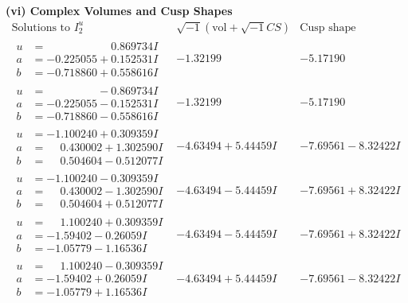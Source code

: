 \documentclass[1p]{elsarticle_modified}
\theoremstyle{definition}
\newcommand{\I}{\sqrt{-1}}
\begin{document}
\newpage\flushleft \textbf{(vi) Complex Volumes and Cusp Shapes}
$$\begin{array}{c|c|c}  
\text{Solutions to }I^u_{2}& \I (\text{vol} + \sqrt{-1}CS) & \text{Cusp shape}\\
 \hline 
\begin{aligned}
u &= \phantom{-0.000000 -}0.869734 I \\
a &= -0.225055 + 0.152531 I \\
b &= -0.718860 + 0.558616 I\end{aligned}
 & -1.32199\phantom{ +0.000000I} & -5.17190\phantom{ +0.000000I} \\ \hline\begin{aligned}
u &= \phantom{-0.000000 } -0.869734 I \\
a &= -0.225055 - 0.152531 I \\
b &= -0.718860 - 0.558616 I\end{aligned}
 & -1.32199\phantom{ +0.000000I} & -5.17190\phantom{ +0.000000I} \\ \hline\begin{aligned}
u &= -1.100240 + 0.309359 I \\
a &= \phantom{-}0.430002 + 1.302590 I \\
b &= \phantom{-}0.504604 - 0.512077 I\end{aligned}
 & -4.63494 + 5.44459 I & -7.69561 - 8.32422 I \\ \hline\begin{aligned}
u &= -1.100240 - 0.309359 I \\
a &= \phantom{-}0.430002 - 1.302590 I \\
b &= \phantom{-}0.504604 + 0.512077 I\end{aligned}
 & -4.63494 - 5.44459 I & -7.69561 + 8.32422 I \\ \hline\begin{aligned}
u &= \phantom{-}1.100240 + 0.309359 I \\
a &= -1.59402 - 0.26059 I \\
b &= -1.05779 - 1.16536 I\end{aligned}
 & -4.63494 - 5.44459 I & -7.69561 + 8.32422 I \\ \hline\begin{aligned}
u &= \phantom{-}1.100240 - 0.309359 I \\
a &= -1.59402 + 0.26059 I \\
b &= -1.05779 + 1.16536 I\end{aligned}
 & -4.63494 + 5.44459 I & -7.69561 - 8.32422 I \\ \hline\begin{aligned}

\end{aligned}
\end{array}$$
\end{document}
